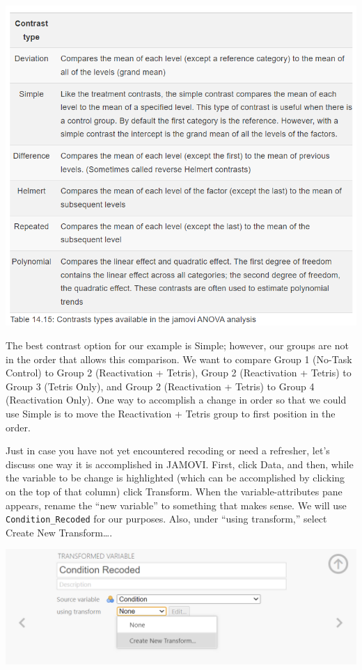 \documentclass[
]{book}
\begin{document}
\includegraphics{img/ContrastTypesTableFromLSJ.png}

The best contrast option for our example is Simple; however, our groups are not in the order that allows this comparison. We want to compare Group 1 (No-Task Control) to Group 2 (Reactivation + Tetris), Group 2 (Reactivation + Tetris) to Group 3 (Tetris Only), and Group 2 (Reactivation + Tetris) to Group 4 (Reactivation Only). One way to accomplish a change in order so that we could use Simple is to move the Reactivation + Tetris group to first position in the order.

Just in case you have not yet encountered recoding or need a refresher, let's discuss one way it is accomplished in JAMOVI. First, click {Data}, and then, while the variable to be change is highlighted (which can be accomplished by clicking on the top of that column) click {Transform}. When the variable-attributes pane appears, rename the ``new variable'' to something that makes sense. We will use \texttt{Condition\_Recoded} for our purposes. Also, under ``using transform,'' select {Create New Transform\ldots{}}.

\includegraphics{img/RecodingConditionForPlannedContrasts.png}
\end{document}
